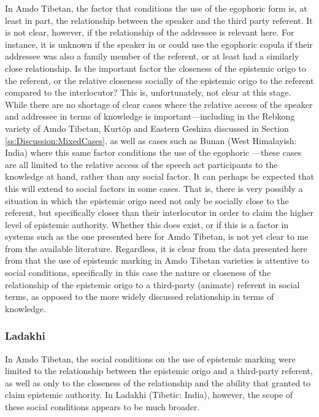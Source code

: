 In Amdo Tibetan, the factor that conditions the use of the egophoric form is, at least in part, the relationship between the speaker and the third party referent. It is not clear, however, if the relationship of the addressee is relevant here. For instance, it is unknown if the speaker in  or  could use the egophoric copula if their addressee was also a family member of the referent, or at least had a similarly close relationship. Is the important factor the closeness of the epistemic origo to the referent, or the relative closeness socially of the epistemic origo to the referent compared to the interlocutor? This is, unfortunately, not clear at this stage. While there are no shortage of clear cases where the relative access of the speaker and addressee in terms of knowledge is important---including in the Rebkong variety of Amdo Tibetan, Kurtöp and Eastern Geshiza discussed in Section \ref{ss:Discussion:MixedCases}, as well as cases such as Bunan (West Himalayish: India) where this same factor conditions the use of the egophoric \cite[469]{Widmer2014}---these cases are all limited to the relative access of the speech act participants to the knowledge at hand, rather than any social factor. It can perhaps be expected that this will extend to social factors in some cases. That is, there is very possibly a situation in which the epistemic origo need not only be socially close to the referent, but specifically closer than their interlocutor in order to claim the higher level of epistemic authority. Whether this does exist, or if this is a factor in systems such as the one presented here for Amdo Tibetan, is not yet clear to me from the available literature. Regardless, it is clear from the data presented here from  that the use of epistemic marking in Amdo Tibetan varieties is attentive to social conditions, specifically in this case the nature or closeness of the relationship of the epistemic origo to a third-party (animate) referent in social terms, as opposed to the more widely discussed relationship in terms of knowledge.

\subsubsection{Ladakhi}\label{sss:Discussion:LadakhiCase}
In Amdo Tibetan, the social conditions on the use of epistemic marking were limited to the relationship between the epistemic origo and a third-party referent, as well as only to the closeness of the relationship and the ability that granted to claim epistemic authority. In Ladakhi (Tibetic: India), however, the scope of these social conditions appears to be much broader.

